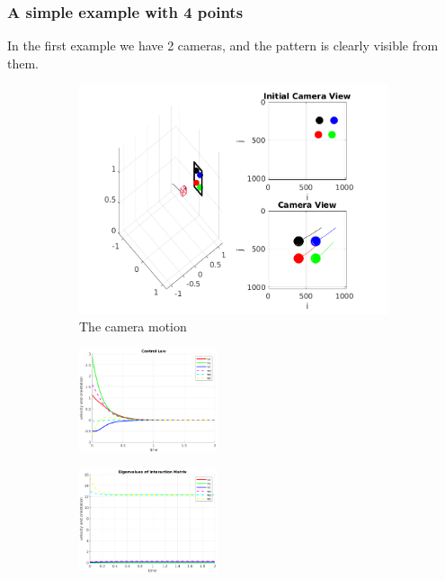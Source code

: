 \documentclass[a4paper,12pt]{article}
\begin{document}
\subsubsection{A simple example with 4 points}
In the first example we have 2 cameras, and the pattern is clearly visible from them.
\begin{figure}[t!]
                 \begin{subfigure}[b]{\textwidth}         
                \centering
                 \includegraphics[width=12cm]{../results/Demo1-simulation.png}
             \caption{The camera motion}
             \vspace{8pt}
                 \end{subfigure}
         \begin{subfigure}[b]{0.32\textwidth}
                \centering
                \includegraphics[height=1.2in]{../results/Demo1-control-law.png}
                 \end{subfigure}
         \begin{subfigure}[b]{0.2\textwidth}
                \centering
                \includegraphics[height=1.2in]{../results/Demo1-eignen.png}

\end{subfigure}
\end{figure}
\end{document}
